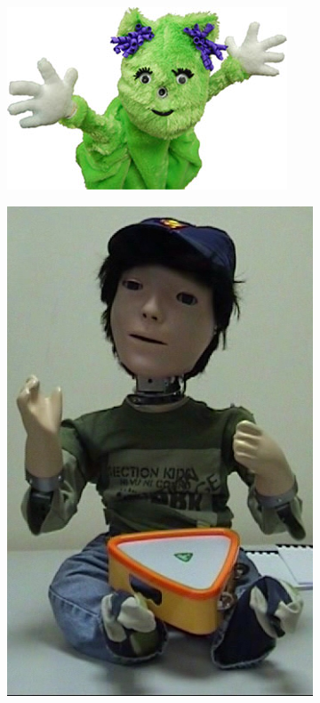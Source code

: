\documentclass[a4paper,twoside]{book}
\begin{document}
\begin{figure}[h]
\centering
\begin{subfigure}[b]{0.3\textwidth}
\includegraphics[width=\textwidth]{img/Cabibihan}
\end{subfigure}\quad
\begin{subfigure}[b]{0.3\textwidth}
\includegraphics[width=\textwidth]{img/Dautenhahn}

\end{subfigure}
\end{figure}
\end{document}
